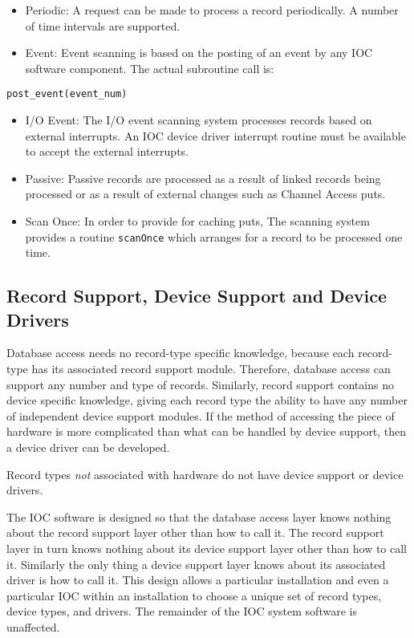 \begin{itemize}\item Periodic:  A request can be made to process a record periodically. A number of time intervals are supported.

\item Event:  Event scanning is based on the posting of an event by any IOC software component. The actual subroutine 
call is:

\end{itemize}\begin{verbatim}post_event(event_num)
\end{verbatim}\begin{itemize}\item I/O Event:  The I/O event scanning system processes records based on external interrupts. An IOC device driver 
interrupt routine must be available to accept the external interrupts.

\item Passive:  Passive records are processed as a result of linked records being processed or as a result of external 
changes such as Channel Access puts.

\item Scan Once: In order to provide for caching puts, The scanning system provides a routine \verb|scanOnce| which 
arranges for a record to be processed one time.

\end{itemize}\subsection{Record Support, Device Support and Device Drivers}

Database access needs no record-type specific knowledge, because each record-type has its associated record support 
module. Therefore, database access can support any number and type of records. Similarly, record support contains no 
device specific knowledge, giving each record type the ability to have any number of independent device support 
modules. If the method of accessing the piece of hardware is more complicated than what can be handled by device 
support, then a device driver can be developed. 

Record types \emph{not} associated with hardware do not have device support or device drivers.

The IOC software is designed so that the database access layer knows nothing about the record support layer other than 
how to call it. The record support layer in turn knows nothing about its device support layer other than how to call it. 
Similarly the only thing a device support layer knows about its associated driver is how to call it. This design allows a 
particular installation and even a particular IOC within an installation to choose a unique set of record types, device types, 
and drivers. The remainder of the IOC system software is unaffected.

